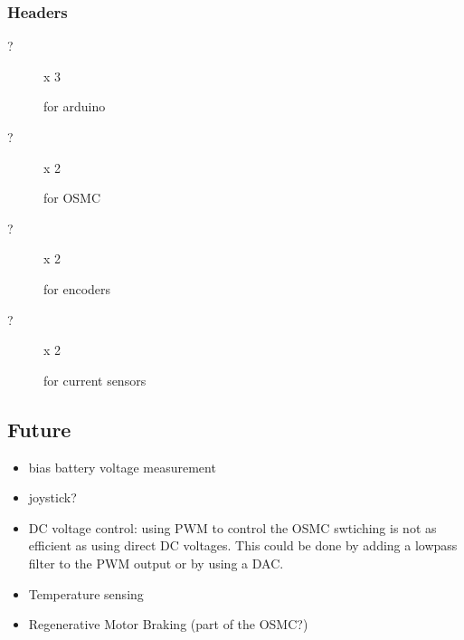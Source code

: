\documentclass[letterpaper,12pt,notitlepage]{report}
\begin{document}
\subsubsection{Headers}
\begin{description}
 \item[?] x 3

for arduino

 \item[?] x 2

for OSMC

 \item[?] x 2

for encoders

 \item[?] x 2

for current sensors

 \end{description}

\subsection{Future}
\begin{itemize}
 \item bias battery voltage measurement
 \item joystick?
 \item DC voltage control: using PWM to control the OSMC swtiching is not as efficient as using direct DC voltages.  This could be done by adding a lowpass filter to the PWM output or by using a DAC.
 \item Temperature sensing
 \item Regenerative Motor Braking (part of the OSMC?)
\end{itemize}
\end{document}
